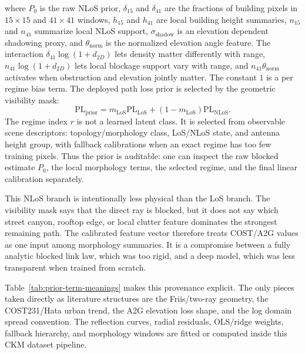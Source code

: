 \documentclass[journal]{IEEEtran}
\begin{document}
where \(P_0\) is the raw NLoS prior, \(\delta_{15}\) and \(\delta_{41}\) are the
fractions of building pixels in \(15\times15\) and \(41\times41\) windows,
\(h_{15}\) and \(h_{41}\) are local building height summaries, \(n_{15}\) and
\(n_{41}\) summarize local NLoS support, \(\sigma_{\mathrm{shadow}}\) is an
elevation dependent shadowing proxy, and \(\theta_{\mathrm{norm}}\) is the
normalized elevation angle feature. The interaction
\(\delta_{41}\log(1+d_{2D})\) lets density matter differently with range,
\(n_{41}\log(1+d_{2D})\) lets local blockage support vary with range, and
\(n_{41}\theta_{\mathrm{norm}}\) activates when obstruction and elevation
jointly matter.
The constant \(1\) is a per regime bias term. The
deployed path loss prior is selected by the geometric visibility mask:
\begin{equation}
\mathrm{PL}_{\mathrm{prior}}
=m_{\mathrm{LoS}}\mathrm{PL}_{\mathrm{LoS}}
+(1-m_{\mathrm{LoS}})\mathrm{PL}_{\mathrm{NLoS}}.
\label{eq:path-prior-paper}
\end{equation}
The regime index \(r\) is not a learned latent class. It is selected from
observable scene descriptors: topology/morphology class, LoS/NLoS state, and
antenna height group, with fallback calibrations when an exact regime has too
few training pixels. Thus the prior is auditable: one can inspect the raw
blocked estimate \(P_0\), the local morphology terms, the selected regime, and
the final linear calibration separately.

This NLoS branch is intentionally less physical than the LoS branch. The
visibility mask says that the direct ray is blocked, but it does not say which
street canyon, rooftop edge, or local clutter feature dominates the strongest
remaining path. The calibrated feature vector therefore treats COST/A2G values
as one input among morphology summaries. It is a compromise between a fully
analytic blocked link law, which was too rigid, and a deep model, which was less
transparent when trained from scratch.

Table~\ref{tab:prior-term-meanings} makes this provenance explicit. The only
pieces taken directly as literature structures are the Friis/two-ray geometry,
the COST231/Hata urban trend, the A2G elevation loss shape, and the log domain
spread convention. The reflection curves, radial residuals, OLS/ridge weights,
fallback hierarchy, and morphology windows are fitted or computed inside this
CKM dataset pipeline.
\end{document}
